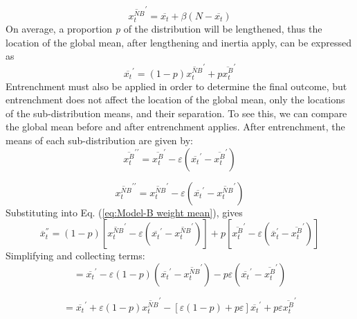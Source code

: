\begin{equation}
\overline{x_{t}^{NB}}^{\prime}=\overline{x_{t}}+\beta(N-\overline{x_{t}})\label{eq:Model-B NB-Prime}
\end{equation}
On average, a proportion \emph{p} of the distribution will be lengthened,
thus the location of the global mean, after lengthening and inertia
apply, can be expressed as
\begin{equation}
\overline{x_{t}}^{\prime}=(1-p)\overline{x_{t}^{NB}}^{\prime}+p\overline{x_{t}^{B}}^{\prime}\label{eq:Model-B weight mean}
\end{equation}
Entrenchment must also be applied in order to determine the final
outcome, but entrenchment does not affect the location of the global
mean, only the locations of the sub-distribution means, and their
separation. To see this, we can compare the global mean before and
after entrenchment applies. After entrenchment, the means of each
sub-distribution are given by:
\begin{equation}
\overline{x_{t}^{B}}^{\prime\prime}=\overline{x_{t}^{B}}^{\prime}-\varepsilon\left(\overline{x_{t}}^{\prime}-\overline{x_{t}^{B}}^{\prime}\right)
\end{equation}

\begin{equation}
\overline{x_{t}^{NB}}^{\prime\prime}=\overline{x_{t}^{NB}}^{\prime}-\varepsilon\left(\overline{x_{t}}^{\prime}-\overline{x_{t}^{NB}}^{\prime}\right)
\end{equation}
Substituting into Eq. (\ref{eq:Model-B weight mean}), gives
\begin{equation}
\overline{x}_{t}^{''}=(1-p)\left[\overline{x_{t}^{NB}}^{\prime}-\varepsilon\left(\overline{x_{t}}^{\prime}-\overline{x_{t}^{NB}}^{\prime}\right)\right]+p\left[\overline{x_{t}^{B}}^{\prime}-\varepsilon\left(\overline{x}_{t}^{\prime}-\overline{x_{t}^{B}}^{\prime}\right)\right]
\end{equation}
Simplifying and collecting terms:
\begin{equation}
=\overline{x_{t}}^{\prime}-\varepsilon(1-p)\left(\overline{x_{t}}^{\prime}-\overline{x_{t}^{NB}}^{\prime}\right)-p\varepsilon\left(\overline{x_{t}}^{\prime}-\overline{x_{t}^{B}}^{\prime}\right)
\end{equation}

\begin{equation}
=\overline{x_{t}}^{\prime}+\varepsilon(1-p)\overline{x_{t}^{NB}}^{\prime}-\left[\varepsilon(1-p)+p\varepsilon\right]\overline{x_{t}}^{\prime}+p\varepsilon\overline{x_{t}^{B}}^{\prime}
\end{equation}

